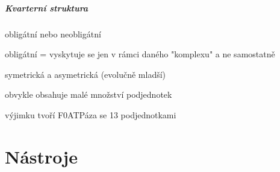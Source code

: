 \documentclass[DIV=8]{scrreprt}
\begin{document}
\paragraph{Kvarterní struktura}
\begin{myItemize}[nosep]
    \item obligátní nebo neobligátní
\begin{myItemize}[nosep]
    \item obligátní = vyskytuje se jen v rámci daného "komplexu" a ne samostatně
\end{myItemize}

    \item symetrická a asymetrická (evolučně mladší)
    \item obvykle obsahuje malé množství podjednotek
\begin{myItemize}[nosep]
    \item výjimku tvoří F0ATPáza se 13 podjednotkami
\end{myItemize}

\end{myItemize}



\chapter{Nástroje} \label{Nástroje}


\end{document}
